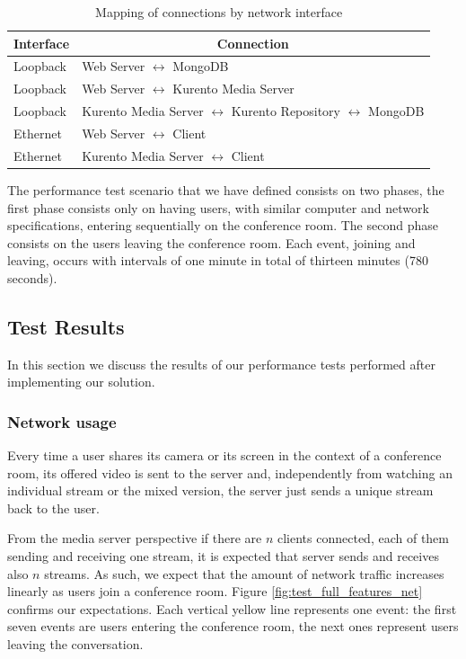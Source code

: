   \begin{table}
\centering
\caption{Mapping of connections by network interface}
\label{table:interfacemap}
\begin{tabular}{|l|l|}
\hline
\multicolumn{1}{|c|}{\textbf{Interface}} & \multicolumn{1}{c|}{\textbf{Connection}}         \\ \hline
Loopback & Web Server $\leftrightarrow$ MongoDB  \\ \hline
Loopback & Web Server $\leftrightarrow$ Kurento Media Server  \\ \hline
Loopback & Kurento Media Server $\leftrightarrow$ Kurento Repository $\leftrightarrow$ MongoDB  \\ \hline
Ethernet & Web Server $\leftrightarrow$ Client\\ \hline
Ethernet & Kurento Media Server $\leftrightarrow$ Client\\ \hline
\end{tabular}
\end{table}


      The performance test scenario that we have defined consists on two phases, the first phase consists only on having users, with similar computer and network specifications, entering sequentially on the conference room. The second phase consists on the users leaving the conference room. Each event, joining and leaving, occurs with intervals of one minute in total of thirteen minutes (780 seconds).

  


\subsection{Test Results}
  
      In this section we discuss the results of our performance tests performed after implementing our solution.
\subsubsection{Network usage}

      Every time a user shares its camera or its screen in the context of a conference room, its offered video is sent to the server and, independently from watching an individual stream or the mixed version, the server just sends a unique stream back to the user.

      From the media server perspective if there are $n$ clients connected, each of them sending and receiving one stream, it is expected that server sends and receives also $n$ streams. As such, we expect that the amount of network traffic increases linearly as users join a conference room. Figure \ref{fig:test_full_features_net} confirms our expectations. Each vertical yellow line represents one event: the first seven events are users entering the conference room, the next ones represent users leaving the conversation. 
      

